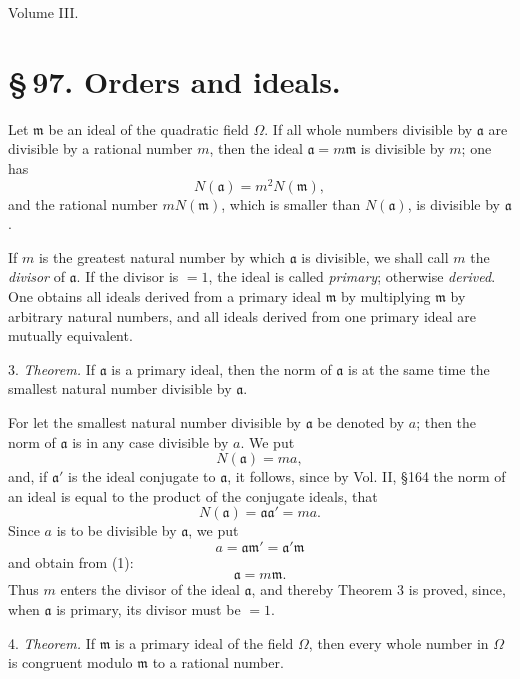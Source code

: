 \documentclass[11pt]{article}
\begin{document}
\begin{center}{\large Volume III.}\end{center}


\section*{\S\,97. Orders and ideals.}

Let $\mathfrak m$ be an ideal of the quadratic field $\Omega$. If all whole numbers divisible by $\mathfrak a$ are divisible by a rational number $m$, then the ideal $\mathfrak a=m\mathfrak m$ is divisible by $m$; one has
\[
 N(\mathfrak a)=m^2N(\mathfrak m),
\]
and the rational number $mN(\mathfrak m)$, which is smaller than $N(\mathfrak a)$, is divisible by $\mathfrak a$.

If $m$ is the greatest natural number by which $\mathfrak a$ is divisible, we shall call $m$ the \emph{divisor} of $\mathfrak a$. If the divisor is $=1$, the ideal is called \emph{primary}; otherwise \emph{derived}. One obtains all ideals derived from a primary ideal $\mathfrak m$ by multiplying $\mathfrak m$ by arbitrary natural numbers, and all ideals derived from one primary ideal are mutually equivalent.

3. \emph{Theorem.} If $\mathfrak a$ is a primary ideal, then the norm of $\mathfrak a$ is at the same time the smallest natural number divisible by $\mathfrak a$.

For let the smallest natural number divisible by $\mathfrak a$ be denoted by $a$; then the norm of $\mathfrak a$ is in any case divisible by $a$. We put
\[
 N(\mathfrak a)=ma,
\]
and, if $\mathfrak a'$ is the ideal conjugate to $\mathfrak a$, it follows, since by Vol. II, \S 164 the norm of an ideal is equal to the product of the conjugate ideals, that
\begin{equation}
 N(\mathfrak a)=\mathfrak a\mathfrak a'=ma.
\tag{1}
\end{equation}
Since $a$ is to be divisible by $\mathfrak a$, we put
\[
 a=\mathfrak a\mathfrak m'=\mathfrak a'\mathfrak m
\]
and obtain from (1):
\begin{equation}
 \mathfrak a=m\mathfrak m.
\tag{2}
\end{equation}
Thus $m$ enters the divisor of the ideal $\mathfrak a$, and thereby Theorem 3 is proved, since, when $\mathfrak a$ is primary, its divisor must be $=1$.

4. \emph{Theorem.} If $\mathfrak m$ is a primary ideal of the field $\Omega$, then every whole number in $\Omega$ is congruent modulo $\mathfrak m$ to a rational number.
\end{document}
